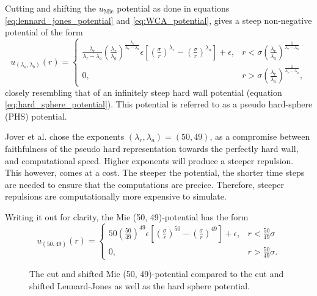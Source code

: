 Cutting and shifting the $u_{\text{Mie}}$ potential as done in equations
\eqref{eq:lennard_jones_potential} and \eqref{eq:WCA_potential},
gives a steep non-negative potential of the form
\begin{equation}
    u_{(\lambda_a, \lambda_b)}(r) = 
    \begin{cases}
        \frac{\lambda_r}{\lambda_r - \lambda_a}
        \left(\frac{\lambda_r}{\lambda_a}\right)
        ^{\frac{\lambda_a}{\lambda_r - \lambda_a}}
        \epsilon \left[
            \left(\frac{\sigma}{r}\right)^{\lambda_r} -
            \left(\frac{\sigma}{r}\right)^{\lambda_a}
        \right]
        + \epsilon,
            & r < \sigma \left(
                \frac{\lambda_r}{\lambda_a}
            \right)^\frac{1}{\lambda_r - \lambda_a} \\
        0,  & r > \sigma \left(
                \frac{\lambda_r}{\lambda_a}
            \right)^\frac{1}{\lambda_r - \lambda_a},
    \end{cases}
\end{equation}
closely resembling that of an infinitely steep hard wall potential (equation \eqref{eq:hard_sphere_potential}).
This potential is referred to as a pseudo hard-sphere (PHS) potential.

Jover et al. chose the exponents $(\lambda_r, \lambda_a) = (50, 49)$, 
as a compromise between faithfulness of the pseudo hard representation 
towards the perfectly hard wall, and computational speed.
Higher exponents will produce a steeper repulsion. 
This however, comes at a cost. 
The steeper the potential, the shorter time steps are 
needed to ensure that the computations are precice.
Therefore, steeper repulsions are computationally more expensive to simulate.

Writing it out for clarity, the Mie (50, 49)-potential has the form
\begin{equation}
    u_{(50, 49)}(r) = 
    \begin{cases}
        50
        \left(\frac{50}{49}\right)
        ^{49}
        \epsilon \left[
            \left(\frac{\sigma}{r}\right)^{50} -
            \left(\frac{\sigma}{r}\right)^{49}
        \right]
        + \epsilon,
            & r < \frac{50}{49} \sigma\\
        0,  & r > \frac{50}{49} \sigma.
    \end{cases}
\end{equation}

\begin{figure}
    
    \caption{The cut and shifted Mie (50, 49)-potential 
            compared to the cut and shifted Lennard-Jones 
            as well as the hard sphere potential.
    }
\end{figure}

